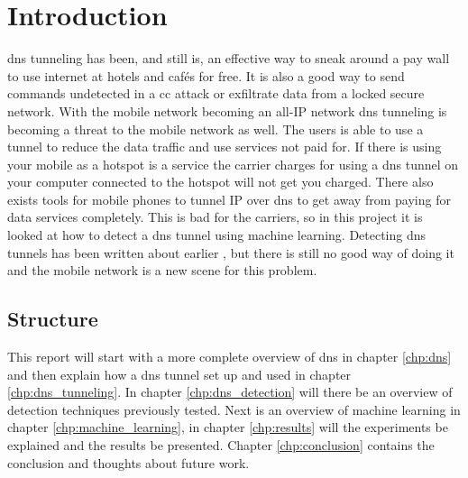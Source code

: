 \chapter{Introduction}
\label{chp:intro}

\gls{dns} tunneling has been, and still is, an effective way to sneak around a pay wall to use internet at hotels and cafés for free. It is also a good way to send commands undetected in a \gls{cc} attack or exfiltrate data from a locked secure network. With the mobile network becoming an all-IP network \gls{dns} tunneling is becoming a threat to the mobile network as well. The users is able to use a tunnel to reduce the data traffic and use services not paid for. If there is using your mobile as a hotspot is a service the carrier charges for using a \gls{dns} tunnel on your computer connected to the hotspot will not get you charged. There also exists tools for mobile phones to tunnel IP over \gls{dns} to get away from paying for data services completely. This is bad for the carriers, so in this project it is looked at how to detect a \gls{dns} tunnel using machine learning. Detecting \gls{dns} tunnels has been written about earlier \cite{farnham2013detecting}, but there is still no good way of doing it and the mobile network is a new scene for this problem. 



\section{Structure}
This report will start with a more complete overview of \gls{dns} in chapter \ref{chp:dns} and then explain how a \gls{dns} tunnel set up and used in chapter \ref{chp:dns_tunneling}. In chapter \ref{chp:dns_detection} will there be an overview of detection techniques previously tested. Next is an overview of machine learning in chapter \ref{chp:machine_learning}, in chapter \ref{chp:results} will the experiments be explained and the results be presented. Chapter \ref{chp:conclusion} contains the conclusion and thoughts about future work. 